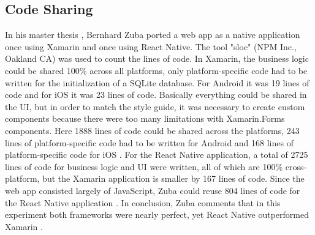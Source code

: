 \documentclass[Bachelor,BIF,english]{twbook}
\begin{document}
\subsection{Code Sharing}
In his master thesis \cite{ZubaBernhard2017EdPb}, Bernhard Zuba ported a web app as a native application once using Xamarin and once using React Native. The tool "sloc" (NPM Inc., Oakland CA) was used to count the lines of code. In Xamarin, the business logic could be shared 100\% across all platforms, only platform-specific code had to be written for the initialization of a SQLite database. For Android it was 19 lines of code and for iOS it was 23 lines of code. Basically everything could be shared in the UI, but in order to match the style guide, it was necessary to create custom components because there were too many limitations with Xamarin.Forms components. Here 1888 lines of code could be shared across the platforms, 243 lines of platform-specific code had to be written for Android and 168 lines of platform-specific code for iOS \cite[p.~71]{ZubaBernhard2017EdPb}. For the React Native application, a total of 2725 lines of code for business logic and UI were written, all of which are 100\% cross-platform, but the Xamarin application is smaller by 167 lines of code. Since the web app consisted largely of JavaScript, Zuba could reuse 804 lines of code for the React Native application \cite[p.~72]{ZubaBernhard2017EdPb}. In conclusion, Zuba comments that in this experiment both frameworks were nearly perfect, yet React Native outperformed Xamarin \cite[p.~72-73]{ZubaBernhard2017EdPb}.
\end{document}
